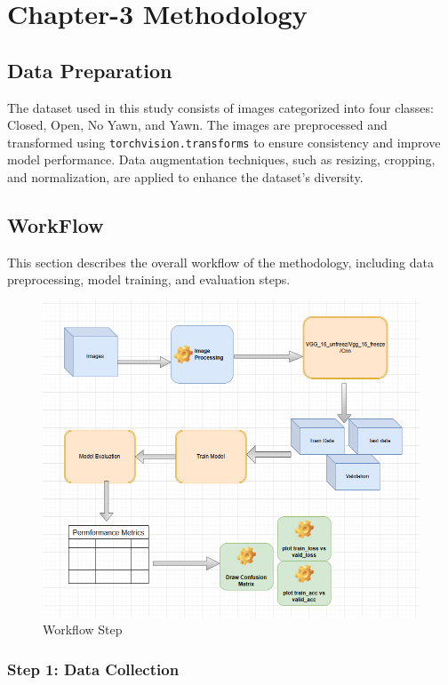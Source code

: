 \chapter{Chapter-3 Methodology}

\section{Data Preparation}

The dataset used in this study consists of images categorized into four classes: Closed, Open, No Yawn, and Yawn. The images are preprocessed and transformed using \texttt{torchvision.transforms} to ensure consistency and improve model performance. Data augmentation techniques, such as resizing, cropping, and normalization, are applied to enhance the dataset's diversity.

\section{WorkFlow}

This section describes the overall workflow of the methodology, including data preprocessing, model training, and evaluation steps.

\begin{figure}[H]
  \centering
  \includegraphics[width=1\linewidth]{common_workflow.png}
  \caption{Workflow Step}
  \label{fig:workflow1}
\end{figure}

\subsection{Step 1: Data Collection}


